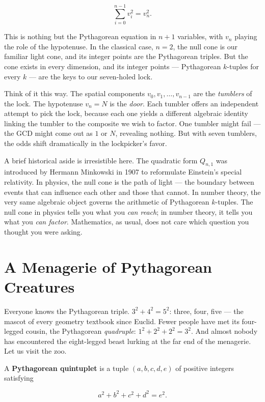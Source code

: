 \documentclass[11pt,twoside,openright]{book}
\theoremstyle{definition}
\theoremstyle{remark}
\begin{document}
\[\sum_{i=0}^{n-1} v_i^2 = v_n^2.\]

This is nothing but the Pythagorean equation in $n + 1$ variables, with $v_n$ playing the role of the hypotenuse. In the classical case, $n = 2$, the null cone is our familiar light cone, and its integer points are the Pythagorean triples. But the cone exists in every dimension, and its integer points --- Pythagorean $k$-tuples for every $k$ --- are the keys to our seven-holed lock.

Think of it this way. The spatial components $v_0, v_1, \ldots, v_{n-1}$ are the \textit{tumblers} of the lock. The hypotenuse $v_n = N$ is the \textit{door}. Each tumbler offers an independent attempt to pick the lock, because each one yields a different algebraic identity linking the tumbler to the composite we wish to factor. One tumbler might fail --- the GCD might come out as $1$ or $N$, revealing nothing. But with seven tumblers, the odds shift dramatically in the lockpicker's favor.


A brief historical aside is irresistible here. The quadratic form $Q_{n,1}$ was introduced by Hermann Minkowski in 1907 to reformulate Einstein's special relativity. In physics, the null cone is the path of light --- the boundary between events that can influence each other and those that cannot. In number theory, the very same algebraic object governs the arithmetic of Pythagorean $k$-tuples. The null cone in physics tells you what you \textit{can reach}; in number theory, it tells you what you \textit{can factor}. Mathematics, as usual, does not care which question you thought you were asking.


\section{A Menagerie of Pythagorean Creatures}

Everyone knows the Pythagorean triple. $3^2 + 4^2 = 5^2$: three, four, five --- the mascot of every geometry textbook since Euclid. Fewer people have met its four-legged cousin, the Pythagorean \textit{quadruple}: $1^2 + 2^2 + 2^2 = 3^2$. And almost nobody has encountered the eight-legged beast lurking at the far end of the menagerie. Let us visit the zoo.

A \textbf{Pythagorean quintuplet} is a tuple $(a, b, c, d, e)$ of positive integers satisfying

\[a^2 + b^2 + c^2 + d^2 = e^2.\]
\end{document}
